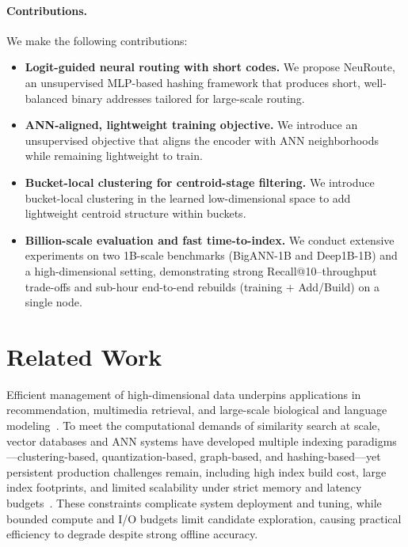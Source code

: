 \documentclass[sigconf, nonacm]{acmart}
\begin{document}
\paragraph{Contributions.}
We make the following contributions:
\begin{itemize}
  \item \textbf{Logit-guided neural routing with short codes.}
  We propose NeuRoute, an unsupervised MLP-based hashing framework that produces short, well-balanced binary addresses tailored for large-scale routing.

  \item \textbf{ANN-aligned, lightweight training objective.}
  We introduce an unsupervised objective that aligns the encoder with ANN neighborhoods while remaining lightweight to train.

  \item \textbf{Bucket-local clustering for centroid-stage filtering.}
  We introduce bucket-local clustering in the learned low-dimensional space to add lightweight centroid structure within buckets.

  \item \textbf{Billion-scale evaluation and fast time-to-index.}
  We conduct extensive experiments on two 1B-scale benchmarks (BigANN-1B and Deep1B-1B) and a high-dimensional setting, demonstrating strong Recall@10--throughput trade-offs and sub-hour end-to-end rebuilds (training $+$ Add/Build) on a single node.
\end{itemize}

\section{Related Work}
\label{sec:RelatedWork}

Efficient management of high-dimensional data underpins applications in recommendation,
multimedia retrieval, and large-scale biological and language modeling~\cite{10.1145/3448016.3457550}.
To meet the computational demands of similarity search at scale, vector databases and ANN systems
have developed multiple indexing paradigms—clustering-based, quantization-based, graph-based, and
hashing-based—yet persistent production challenges remain, including high index build cost, large
index footprints, and limited scalability under strict memory and latency budgets~\cite{pan2023surveyvectordatabasemanagement,ref8}.
These constraints complicate system deployment and tuning, while bounded compute and I/O budgets
limit candidate exploration, causing practical efficiency to degrade despite strong offline accuracy.
\end{document}
